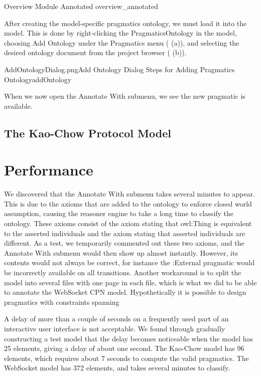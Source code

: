 {Overview Module Annotated}
{overview_annotated}

After creating the model-specific pragmatics ontology, we must load it into the
model. This is done by right-clicking the PragmaticsOntology in the model,
choosing Add Ontology under the Pragmatics menu ( (a)), and
selecting the desired ontology document from the project browser
( (b)).

{AddOntologyDialog.png}{Add Ontology Dialog}
{Steps for Adding Pragmatics Ontology}{addOntology}

When we now open the Annotate With submenu, we see the new pragmatic is
available. 

\subsection{The Kao-Chow Protocol Model}


\section{Performance}

We discovered that the Annotate With submenu takes several minutes to appear.
This is due to the axioms that are added to the ontology to enforce closed world
assumption, causing the reasoner engine to take a long time to classify the
ontology. These axioms consist of the axiom stating that owl:Thing is
equivalent to the asserted individuals and the axiom stating that asserted
individuals are different. As a test, we temporarily commented out these two
axioms, and the Annotate With submenu would then show up almost instantly.
However, its contents would not always be correct, for instance the :External
pragmatic would be incorrectly available on all transitions. Another workaround
is to split the model into several files with one page in each file,
which is what we did to be able to annotate the WebSocket CPN model.
Hypothetically it is possible to design pragmatics with constraints spanning 

A delay of more than a couple of seconds on a frequently used part of an
interactive user interface is not acceptable. We found through gradually
constructing a test model that the delay becomes noticeable when the model has
25 elements, giving a delay of about one second. The Kao-Chow model has 96
elements, which requires about 7 seconds to compute the valid pragmatics. The
WebSocket model has 372 elements, and takes several minutes to classify.

